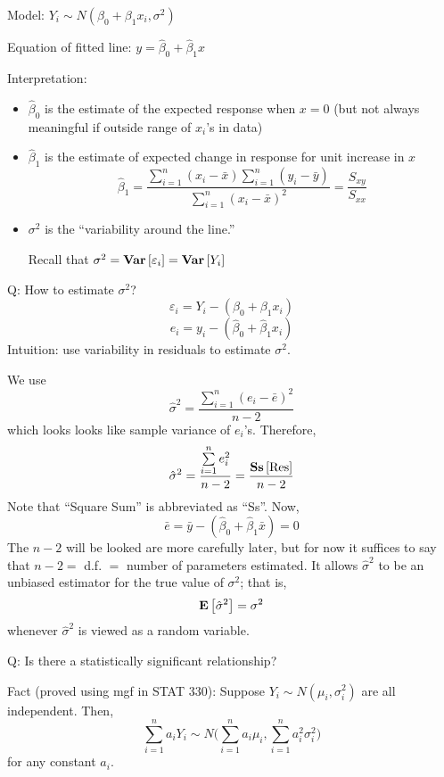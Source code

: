 Model: $ Y_i \sim N(\beta_0+\beta_1x_i,\sigma^2) $

Equation of fitted line: $ y=\hat{\beta}_0+\hat{\beta}_1x $

Interpretation:
\begin{itemize}
    \item $ \hat{\beta}_0 $ is the estimate
          of the expected response when $ x=0 $ (but not always
          meaningful if outside range of $ x_i $'s in data)
    \item $ \hat{\beta}_1 $ is the estimate of
          expected change in response for unit increase in $ x $
          \[ \hat{\beta}_1=\frac{\sum\limits_{i=1}^{n}(x_i-\bar{x})
                  \sum\limits_{i=1}^{n} (y_i-\bar{y})}{
                  \sum\limits_{i=1}^{n} (x_i-\bar{x})^2
              }=\frac{S_{xy}}{S_{xx}}   \]
    \item $ \sigma^2 $ is the
          ``variability around the line.''

          Recall that $ \sigma^2=\bm{\mathrm{Var}}\left[\varepsilon_i\right]=\bm{\mathrm{Var}}\left[Y_i\right] $
\end{itemize}
Q\@: How to estimate $ \sigma^2 $?
\[ \varepsilon_i=Y_i-(\beta_0+\beta_1x_i) \]
\[ e_i=y_i-(\hat{\beta}_0+\hat{\beta}_1x_i) \]
Intuition: use variability in residuals to estimate
$ \sigma^2 $.

We use \[ \hat{\sigma}^2
    =\frac{\sum\limits_{i=1}^{n} (e_i-\bar{e})^2}{n-2} \]
which looks looks like sample variance of $ e_i $'s. Therefore,
\[ \hat{\sigma}^2=\frac{\sum\limits_{i=1}^{n} e_i^2}{n-2}=
    \frac{\bm{\mathrm{Ss}}\left[\text{Res}\right]}{n-2} \]
Note that ``Square Sum'' is abbreviated as ``Ss''. Now,
\[ \bar{e}=\bar{y}-(\hat{\beta}_0+\hat{\beta}_1\bar{x})=0 \]
The $ n-2 $ will be looked are more carefully later, but for now
it suffices to say that $ n-2= $ d.f. $ = $ number of parameters
estimated. It allows $ \hat{\sigma}^2 $ to be an unbiased estimator
for the true value of $ \sigma^2 $; that is,
\[ \bm{\mathrm{E}}\left[\hat{\sigma}^2\right]=\sigma^2 \]
whenever $ \hat{\sigma}^2 $ is viewed as a random variable.

Q\@: Is there a statistically significant relationship?

Fact (proved using mgf in STAT 330): Suppose $ Y_i \sim N(\mu_i,\sigma_i^2) $
are all independent. Then,
\[ \sum\limits_{i=1}^{n} a_i Y_i \sim N
    \biggl( \sum\limits_{i=1}^{n} a_i\mu_i,\sum\limits_{i=1}^{n} a_i^2\sigma_i^2 \biggr) \]
for any constant $ a_i $.

